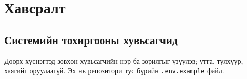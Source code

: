 \documentclass[
12pt,
oneside,
english,
onehalfspacing,
nolistspacing,
headsepline,
]{MUST-Thesis}
\begin{document}
\printbibliography[heading=bibintoc,title={Ном зүй}]

\appendix
\chapter{Хавсралт}

\section{Системийн тохиргооны хувьсагчид}\label{app:env}

Доорх хүснэгтэд зөвхөн хувьсагчийн нэр ба зорилгыг үзүүлэв; утга, түлхүүр, хаягийг оруулаагүй. Эх нь репозитори тус бүрийн \texttt{.env.example} файл.
\end{document}
